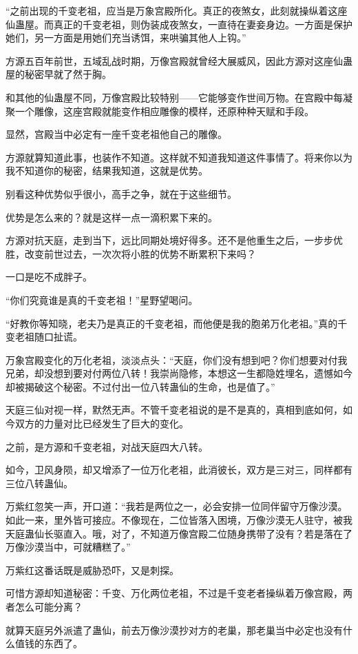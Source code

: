 \begin{this_body}
“之前出现的千变老祖，应当是万象宫殿所化。真正的夜煞女，此刻就操纵着这座仙蛊屋。而真正的千变老祖，则伪装成夜煞女，一直待在妻妾身边。一方面是保护她们，另一方面是用她们充当诱饵，来哄骗其他人上钩。”

方源五百年前世，五域乱战时期，万像宫殿就曾经大展威风，因此方源对这座仙蛊屋的秘密早就了然于胸。

和其他的仙蛊屋不同，万像宫殿比较特别——它能够变作世间万物。在宫殿中每凝聚一个雕像，这座宫殿就能变作相应雕像的模样，还原种种天赋和手段。

显然，宫殿当中必定有一座千变老祖他自己的雕像。

方源就算知道此事，也装作不知道。这样就不知道我知道这件事情了。将来你以为我不知道你的秘密，结果我知道，这就是优势。

别看这种优势似乎很小，高手之争，就在于这些细节。

优势是怎么来的？就是这样一点一滴积累下来的。

方源对抗天庭，走到当下，远比同期处境好得多。还不是他重生之后，一步步优胜，改变前世过去，一次次将小胜的优势不断累积下来吗？

一口是吃不成胖子。

“你们究竟谁是真的千变老祖！”星野望喝问。

“好教你等知晓，老夫乃是真正的千变老祖，而他便是我的胞弟万化老祖。”真的千变老祖随口扯谎。

万象宫殿变化的万化老祖，淡淡点头：“天庭，你们没有想到吧？你们想要对付我兄弟，却没想到要对付两位八转！我崇尚隐修，本想这一生都隐姓埋名，遗憾如今却被揭破这个秘密。不过付出一位八转蛊仙的生命，也是值了。”

天庭三仙对视一样，默然无声。不管千变老祖说的是不是真的，真相到底如何，如今双方的力量对比已经发生了巨大的变化。

之前，是方源和千变老祖，对战天庭四大八转。

如今，卫风身陨，却又增添了一位万化老祖，此消彼长，双方是三对三，同样都有三位八转蛊仙。

万紫红忽笑一声，开口道：“我若是两位之一，必会安排一位同伴留守万像沙漠。如此一来，里外皆可接应。不像现在，二位皆落入困境，万像沙漠无人驻守，被我天庭蛊仙长驱直入。哦，对了，不知道万像宫殿二位随身携带了没有？若是落在了万像沙漠当中，可就糟糕了。”

万紫红这番话既是威胁恐吓，又是刺探。

可惜方源却知道秘密：千变、万化两位老祖，不过是千变老者操纵着万像宫殿，两者怎么可能分离？

就算天庭另外派遣了蛊仙，前去万像沙漠抄对方的老巢，那老巢当中必定也没有什么值钱的东西了。


\end{this_body}
